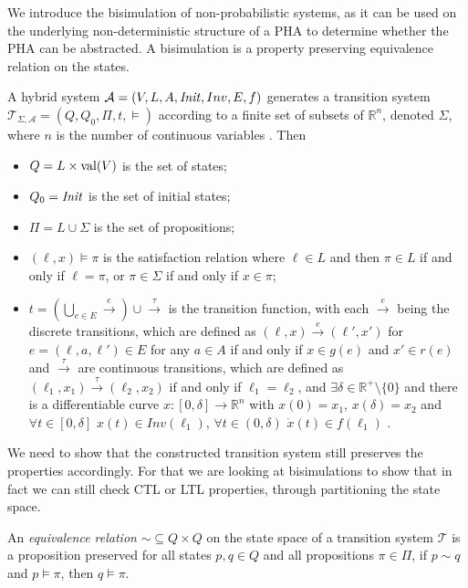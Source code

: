 We introduce the bisimulation of non-probabilistic systems, as it can be used on the underlying non-deterministic structure of a PHA to determine whether the PHA can be abstracted. A bisimulation is a property preserving equivalence relation on the states.

A hybrid system $\mathcal{A}=(V,L,A,\mathit{Init},Inv,E,f)$ generates a transition system $\mathcal{T}_{\Sigma,\mathcal{A}}=(Q,Q_{0},\Pi,t,\models)$ according to a finite set of subsets of $\mathbb{R}^{n}$, denoted $\Sigma$, where $n$ is the number of continuous variables \cite{Alur2000}. Then
\begin{itemize}
\item{$Q=L\times \operatorname{val}(V)$ is the set of states;}
\item{$Q_{0}=\mathit{Init}$ is the set of initial states;}
\item{$\Pi=L\cup\Sigma$ is the set of propositions;}
\item{$(\ell,x)\models\pi$ is the satisfaction relation where $\ell\in L$ and then $\pi\in L$ if and only if $\ell = \pi$, or $\pi\in\Sigma$ if and only if $x\in\pi$;}
\item{$t=(\bigcup_{e\in E}\overset{e}{\rightarrow})\cup \overset{\tau}{\rightarrow}$ is the
transition function, with each $\overset{e}{\rightarrow}$ being the discrete transitions, which are
defined as $(\ell,x)\overset{e}{\rightarrow}(\ell',x')$ for $e=(\ell,a,\ell')\in E$ for any
$a\in A$ if and only if $x\in g(e)$ and $x' \in r(e)$ and $\overset{\tau}{\rightarrow}$ are
continuous transitions, which are defined as
$(\ell_{1},x_{1})\overset{\tau}{\rightarrow}(\ell_{2},x_{2})$ if and only if $\ell_{1}=\ell_{2}$,
and $\exists \delta \in \mathbb{R}^{+}\setminus\{ 0\}$ and there is a differentiable curve
$x:[0,\delta]\rightarrow \mathbb{R}^{n}$ with $x(0)=x_{1}$, $x(\delta)=x_{2}$ and
$\forall t\in[0,\delta]$ $x(t)\in Inv(\ell_{1})$, $\forall t\in (0,\delta)$
$\dot{x}(t)\in f(\ell_{1})$ .}
\end{itemize}


We need to show that the constructed transition system still preserves the properties accordingly. For that we are looking at bisimulations to show that in fact we can still check CTL or LTL properties, through partitioning the state space.

\begin{defi}
An \emph{equivalence relation} $\sim\subseteq Q\times Q$ on the state space of a transition system $\mathcal{T}$ is a proposition preserved for all states $p,q\in Q$ and all propositions $\pi\in\Pi$, if $p\sim q$ and $p\models\pi$, then $q\models\pi$.
\end{defi}

